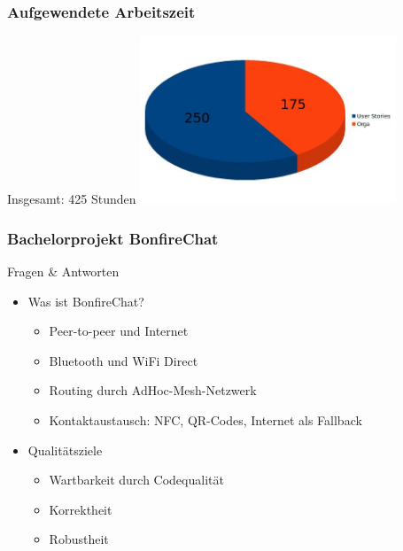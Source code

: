 \documentclass[accentcolor=tud2d,colorbacktitle]{tudbeamer}
\begin{document}
  \begin{frame}
    \frametitle{Aufgewendete Arbeitszeit}
    \begin{center}
      \huge{Insgesamt: 425 Stunden}
      \includegraphics[height=5cm]{zeiten2.jpg}
    \end{center}
  \end{frame}


  \begin{frame}
    \frametitle{Bachelorprojekt BonfireChat}
    \begin{center}
      \huge{Fragen \& Antworten}
    \end{center}
    \vspace{0.5cm}
    \begin{multicols}{2}
      \begin{itemize}
        \item Was ist BonfireChat?
          \begin{itemize}
            \item Peer-to-peer und Internet
            \item Bluetooth und WiFi Direct
            \item Routing durch AdHoc-Mesh-Netzwerk
            \item Kontaktaustausch: NFC, QR-Codes, Internet als Fallback
          \end{itemize}
        \item Qualitätsziele
          \begin{itemize}
            \item Wartbarkeit durch Codequalität
            \item Korrektheit
            \item Robustheit
          \end{itemize}
          \vspace{1cm}
      \end{itemize}
    \end{multicols}
  \end{frame}
\end{document}
